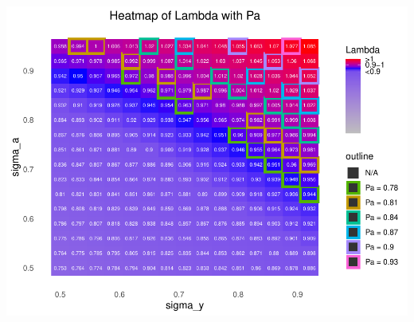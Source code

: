 \documentclass[
  letterpaper,
  DIV=11,
  numbers=noendperiod]{scrartcl}
\begin{document}
\includegraphics{sensitivity_files/figure-pdf/unnamed-chunk-7-1.pdf}
\end{document}
